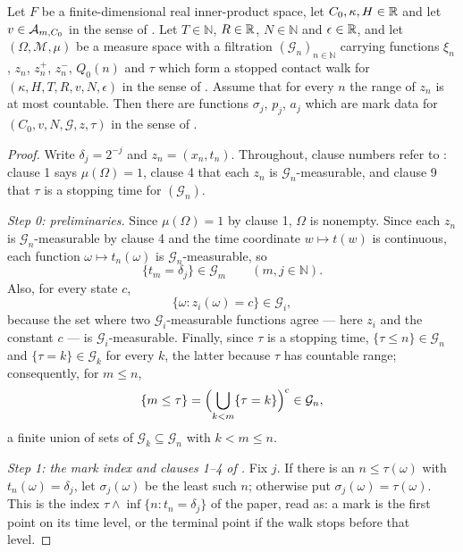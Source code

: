 \begin{lemma}
Let $F$ be a finite-dimensional real inner-product space, let $C_0,\kappa,H\in\mathbb{R}$
and let $v\in\mathcal{A}_{m,C_0}$ in the sense of . Let
$T\in\mathbb N$, $R\in\mathbb{R}$, $N\in\mathbb N$ and $\epsilon\in\mathbb{R}$, and let
$(\Omega,\mathcal M,\mu)$ be a measure space with a filtration
$(\mathcal G_n)_{n\in\mathbb N}$ carrying functions $\xi_n$, $z_n$, $z^+_n$,
$z^-_n$, $Q_0(n)$ and $\tau$ which form a stopped contact walk for
$(\kappa,H,T,R,v,N,\epsilon)$ in the sense of . Assume
that for every $n$ the range of $z_n$ is at most countable. Then there are
functions $\sigma_j$, $p_j$, $a_j$ which are mark data for
$(C_0,v,N,\mathcal G,z,\tau)$ in the sense of .
\end{lemma}
\begin{proof}
Write $\delta_j=2^{-j}$ and $z_n=(x_n,t_n)$. Throughout, clause numbers refer to
: clause 1 says $\mu(\Omega)=1$, clause 4 that each $z_n$
is $\mathcal G_n$-measurable, and clause 9 that $\tau$ is a stopping time for
$(\mathcal G_n)$.

\emph{Step 0: preliminaries.}
Since $\mu(\Omega)=1$ by clause 1, $\Omega$ is nonempty. Since each $z_n$ is
$\mathcal G_n$-measurable by clause 4 and the time coordinate $w\mapsto t(w)$ is
continuous, each function $\omega\mapsto t_n(\omega)$ is
$\mathcal G_n$-measurable, so
\begin{equation}\label{eq:cwm-level}
  \{t_m=\delta_j\}\in\mathcal G_m\qquad(m,j\in\mathbb N).
\end{equation}
Also, for every state $c$,
\begin{equation}\label{eq:cwm-eqset}
  \{\omega:z_i(\omega)=c\}\in\mathcal G_i ,
\end{equation}
because the set where two $\mathcal G_i$-measurable functions agree --- here
$z_i$ and the constant $c$ --- is $\mathcal G_i$-measurable. Finally, since
$\tau$ is a stopping time, $\{\tau\le n\}\in\mathcal G_n$ and
$\{\tau=k\}\in\mathcal G_k$ for every $k$, the latter because $\tau$ has
countable range; consequently, for $m\le n$,
\begin{equation}\label{eq:cwm-ge}
  \{m\le\tau\}=\Bigl(\bigcup_{k<m}\{\tau=k\}\Bigr)^{\rm c}\in\mathcal G_n ,
\end{equation}
a finite union of sets of $\mathcal G_k\subseteq\mathcal G_n$ with $k<m\le n$.

\emph{Step 1: the mark index and clauses 1--4 of .}
Fix $j$. If there is an $n\le\tau(\omega)$ with $t_n(\omega)=\delta_j$, let
$\sigma_j(\omega)$ be the least such $n$; otherwise put
$\sigma_j(\omega)=\tau(\omega)$. This is the index
$\tau\wedge\inf\{n:t_n=\delta_j\}$ of the paper, read as: a mark is the first
point on its time level, or the terminal point if the walk stops before that
level.


\end{proof}
